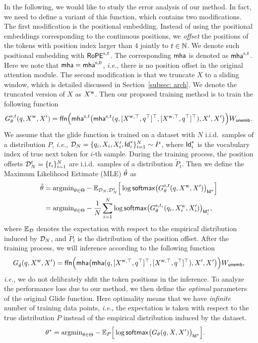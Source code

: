 In the following, we would like to study the error analysis of our method. In fact, we need to define a variant of this function, which contains two modifications. The first modification is the positional embedding. Instead of using the positional embeddings corresponding to the continuous positions, we \emph{offset} the positions of the tokens with position index larger than $4$ jointly to $t\in\mathbb{N}$. We denote such positional embedding with $\mathsf{RoPE}^{\mathrm{s},t}$. The corresponding $\mathsf{mha}$ is denoted as $\mathsf{mha}^{\mathrm{s},t}$. Here we note that $\mathsf{mha}=\mathsf{mha}^{\mathrm{s},0}$, \emph{i.e.}, there is no position offset in the original attention module.
The second modification is that we truncate $X$ to a sliding window, which is detailed discussed in Section~\ref{subsec: arch}. We denote the truncated version of $X$ as $X^{\mathrm{w}}$. Then our proposed training method is to train the following function
\begin{align}
    G_{\theta}^{\mathrm{s},t}(q,X^{\mathrm{w}},X^{\prime}) = \mathsf{ffn}\Big( \mathsf{mha}^{\mathrm{s},t}\big(\mathsf{mha}^{\mathrm{s},t}(q,[X^{\mathrm{w},\top},q^{\top}]^{\top}, [X^{\mathrm{w},\top},q^{\top}]^{\top}), X^{\prime},X^{\prime}\big)\Big)W_{\mathsf{unemb}}. \label{eq:g_train}
\end{align}
We assume that the glide function is trained on a dataset with $N$ i.i.d.\ samples of a distribution $P$, \emph{i.e.}, $\mathcal{D}_{N}=\{q_i,X_i,X_{i}^{\prime}, \mathsf{Id}_{i}^{*}\}_{i=1}^{N}\sim P$, where $\mathsf{Id}_{i}^{*}$ is the vocabulary index of true next token for $i$-th sample. During the training process, the position offsets $\mathcal{D}_N^{t}=\{t_i\}_{i=1}^{N}$ are i.i.d.\ samples of a distribution $\tilde{P}_{t}$. Then we define the Maximum Likelihood Estimate (MLE) $\hat{\theta}$ as 
\begin{align*}
    \hat{\theta} &= \text{argmin}_{\theta\in\Theta}  -\mathbb{E}_{\mathcal{D}_N,\mathcal{D}_{N}^{t}}\Big[\log \mathsf{softmax}\big( G_{\theta}^{\mathrm{s},t}(q,X^{\mathrm{w}},X^{\prime})\big)_{\mathsf{Id}^{*}}\Big] \nonumber\\
    &=\text{argmin}_{\theta\in\Theta} -\frac{1}{N}\sum_{i=1}^{N}\log \mathsf{softmax}\big( G_{\theta}^{\mathrm{s},t_i}(q_{i},X_{i}^{\mathrm{w}},X_{i}^{\prime})\big)_{\mathsf{Id}_{i}^{*}},
\end{align*}
where $\mathbb{E}_{\mathcal{D}}$ denotes the expectation with respect to the empirical distribution induced by $\mathcal{D}_{N}$, and $\tilde{P}_{t}$ is the distribution of the position offset. After the training process, we will inference according to the following function
\begin{align*}
    G_{\hat{\theta}}(q,X^{\mathrm{w}},X^{\prime}) = \mathsf{ffn}\Big( \mathsf{mha}\big(\mathsf{mha}(q,[X^{\mathrm{w},\top},q^{\top}]^{\top}, [X^{\mathrm{w},\top},q^{\top}]^{\top}), X^{\prime},X^{\prime}\big)\Big)W_{\mathsf{unemb}},
\end{align*}
\emph{i.e.}, we do not delibrately shfit the token positions in the inference. To analyze the performance loss due to our method, we then define the \emph{optimal} parameters of the original Glide function. Here optimality means that we have \emph{infinite} number of training data points, \emph{i.e.}, the expectation is taken with respect to the true distribution $P$ instead of the empirical distribution induced by the dataset.
\begin{align*}
    \theta^{*} &= \text{argmin}_{\theta\in\Theta} -\mathbb{E}_{P}\Big[\log \mathsf{softmax}\big( G_{\theta}(q,X,X^{\prime})\big)_{\mathsf{Id}^{*}}\Big].
\end{align*}

